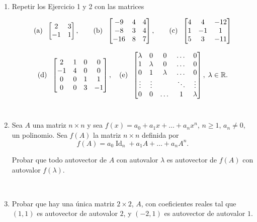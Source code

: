 \documentclass[12pt]{amsart}
\begin{document}
\

\begin{enumerate}[resume]

\item\label{mas} Repetir los Ejercicio 1 y 2 con las matrices 

$$\textrm{(a)\; }\begin{bmatrix} 2 & 3 \\ -1 & 1
\end{bmatrix}, \qquad
\textrm{(b)\; }\begin{bmatrix} -9 & 4 & 4 \\ -8 & 3 & 4 \\ -16 & 8 & 7 \end{bmatrix}, \qquad \textrm{(c)\; } \left[\begin{matrix}4 & 4 & -12\\ 1 & -1 & 1\\ 5 & 3 & -11 \end{matrix} \right]$$

$$
\textrm{(d)\; } \left[\begin{matrix}2 & 1 & 0 & 0\\ -1 & 4 & 0 & 0\\ 0 & 0 & 1 & 1 \\ 0 & 0 & 3 & -1\end{matrix} \right], 
\quad \textrm{(e)\; } \begin{bmatrix} \lambda & 0 & 0 & \dots & 0  \\ 1 & \lambda & 0 &\dots & 0  \\ 0 & 1 & \lambda&  \dots & 0  \\ \vdots & \vdots & \quad & \ddots & \vdots\\ 0 &  0&   \dots & 1  & \lambda \end{bmatrix}, \; \lambda\in \mathbb R.
$$
\

\item Sea $A$ una matriz $n\times n$ y sea $f(x) = a_0 + a_1 x + \dots + a_nx^n$, $n \geq 1$, $a_n \neq 0$, un polinomio. Sea $f(A)$ la matriz $n \times n$ definida por
$$f(A) = a_0 \operatorname{Id}_n + a_1 A + \dots + a_n A^n.$$

Probar que todo autovector de $A$ con autovalor $\lambda$ es autovector de $f(A)$ con autovalor $f(\lambda)$.

\

\item Probar que hay una \'unica matriz $2\times 2$, $A$, con coeficientes reales tal que $(1,1)$ es autovector de autovalor $2$, y $(-2,1)$ es autovector de autovalor $1$. 


\end{enumerate}
\end{document}

